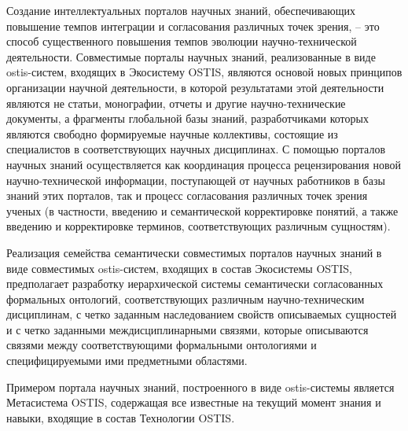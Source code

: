 Создание интеллектуальных порталов научных знаний, обеспечивающих повышение темпов интеграции и согласования различных точек зрения, – это способ существенного повышения темпов эволюции научно-технической деятельности.
Совместимые порталы научных знаний, реализованные в виде ostis-систем, входящих в Экосистему OSTIS, являются основой новых принципов организации научной деятельности, в которой результатами этой деятельности являются не статьи, монографии, отчеты и другие научно-технические документы, а фрагменты глобальной базы знаний, разработчиками которых являются свободно формируемые научные коллективы, состоящие из специалистов в соответствующих научных дисциплинах. 
С помощью порталов научных знаний осуществляется как координация процесса рецензирования новой научно-технической информации, поступающей от научных работников в базы знаний этих порталов, так и процесс согласования различных точек зрения ученых (в частности, введению и семантической корректировке понятий, а также введению и корректировке терминов, соответствующих различным сущностям).

Реализация семейства семантически совместимых порталов научных знаний в виде совместимых ostis-систем, входящих в состав Экосистемы OSTIS, предполагает разработку иерархической системы семантически согласованных формальных онтологий, соответствующих различным научно-техническим дисциплинам, с четко заданным наследованием свойств описываемых сущностей и с четко заданными междисциплинарными связями, которые описываются связями между соответствующими формальными онтологиями и специфицируемыми ими предметными областями.

Примером портала научных знаний, построенного в виде ostis-системы является Метасистема OSTIS, содержащая все известные на текущий момент знания и навыки, входящие в состав Технологии OSTIS.
